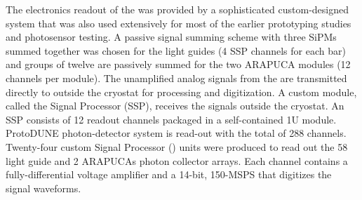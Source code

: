 The electronics readout of the   was provided by a sophisticated custom-designed system that was also used extensively for most of the earlier prototyping studies and photosensor testing.
A passive signal summing scheme with three SiPMs summed together was chosen for the light guides (4 SSP channels for each bar) and groups of twelve  are passively summed for the two ARAPUCA modules (12  channels per module).
The unamplified analog signals from the  are transmitted directly to outside the cryostat for processing and digitization. A custom module, 
called the  Signal Processor (SSP), receives the  signals outside the cryostat. An SSP consists of 12 readout channels packaged in 
a self-contained 1U module. ProtoDUNE photon-detector system is read-out with the total of 288  channels. 
Twenty-four custom  Signal Processor () units were produced to read out the 58 light guide and 2 ARAPUCAs photon collector arrays.
Each channel contains a fully-differential voltage amplifier and a \num{14}-bit, \num{150}-MSPS  that digitizes the  signal waveforms.


